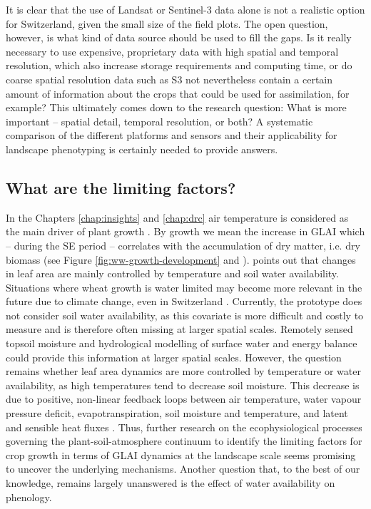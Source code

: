 It is clear that the use of Landsat or Sentinel-3 data alone is not a realistic option for Switzerland, given the small size of the field plots. The open question, however, is what kind of data source should be used to fill the gaps. Is it really necessary to use expensive, proprietary data with high spatial and temporal resolution, which also increase storage requirements and computing time, or do coarse spatial resolution data such as \gls{S3} not nevertheless contain a certain amount of information about the crops that could be used for assimilation, for example? This ultimately comes down to the research question: What is more important -- spatial detail, temporal resolution, or both? A systematic comparison of the different platforms and sensors and their applicability for landscape phenotyping is certainly needed to provide answers.

\subsection{What are the limiting factors?}
In the Chapters \ref{chap:insights} and \ref{chap:drc} air temperature is considered as the main driver of plant growth \citep{porter_temperatures_1999}. By growth we mean the increase in \gls{GLAI} which -- during the \gls{SE} period -- correlates with the accumulation of dry matter, i.e. dry biomass (see Figure \ref{fig:ww-growth-development} and \cite{aase_relationship_1978}). \cite{monteith_climate_1977} points out that changes in leaf area are mainly controlled by temperature and soil water availability. Situations where wheat growth is water limited may become more relevant in the future due to climate change, even in Switzerland \citep{holzkamper_spatial_2015}. Currently, the prototype does not consider soil water availability, as this covariate is more difficult and costly to measure and is therefore often missing at larger spatial scales. Remotely sensed topsoil moisture \citep{lobell_moisture_2002, sadeghi_optical_2017} and hydrological modelling of surface water and energy balance \citep{penman_natural_1948, priestley_assessment_1972, shuttleworth_simplified_1978} could provide this information at larger spatial scales. However, the question remains whether leaf area dynamics are more controlled by temperature or water availability, as high temperatures tend to decrease soil moisture. This decrease is due to positive, non-linear feedback loops between air temperature, water vapour pressure deficit, evapotranspiration, soil moisture and temperature, and latent and sensible heat fluxes \citep{webber_diverging_2018, garcia-garcia_soil_2023}. Thus, further research on the ecophysiological processes governing the plant-soil-atmosphere continuum to identify the limiting factors for crop growth in terms of \gls{GLAI} dynamics at the landscape scale seems promising to uncover the underlying mechanisms. Another question that, to the best of our knowledge, remains largely unanswered is the effect of water availability on phenology.

